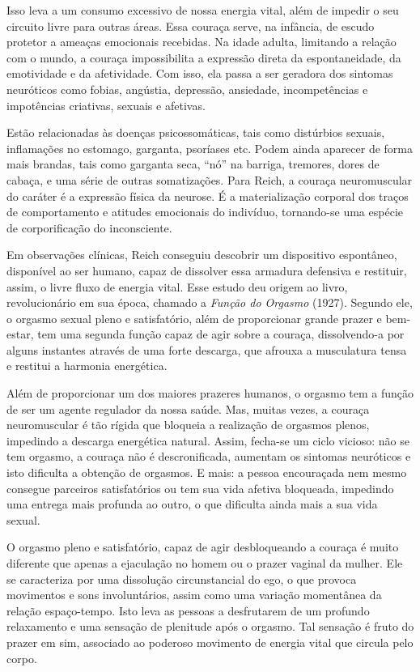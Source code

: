 Isso leva a um consumo excessivo de nossa energia vital, além de impedir
o seu circuito livre para outras áreas. Essa couraça serve, na infância,
de escudo protetor a ameaças emocionais recebidas. Na idade adulta,
limitando a relação com o mundo, a couraça impossibilita a expressão
direta da espontaneidade, da emotividade e da afetividade. Com isso, ela
passa a ser geradora dos sintomas neuróticos como fobias, angústia,
depressão, ansiedade, incompetências e impotências criativas, sexuais e
afetivas.

Estão relacionadas às doenças psicossomáticas, tais como distúrbios
sexuais, inflamações no estomago, garganta, psoríases etc. Podem ainda
aparecer de forma mais brandas, tais como garganta seca, ``nó'' na
barriga, tremores, dores de cabaça, e uma série de outras somatizações.
Para Reich, a couraça neuromuscular do caráter é a expressão física da
neurose. É a materialização corporal dos traços de comportamento e
atitudes emocionais do indivíduo, tornando-se uma espécie de
corporificação do inconsciente.

Em observações clínicas, Reich conseguiu descobrir um dispositivo
espontâneo, disponível ao ser humano, capaz de dissolver essa armadura
defensiva e restituir, assim, o livre fluxo de energia vital. Esse
estudo deu origem ao livro, revolucionário em sua época, chamado a
\emph{Função do Orgasmo} (1927). Segundo ele, o orgasmo sexual pleno e
satisfatório, além de proporcionar grande prazer e bem-estar, tem uma
segunda função capaz de agir sobre a couraça, dissolvendo-a por alguns
instantes através de uma forte descarga, que afrouxa a musculatura tensa
e restitui a harmonia energética.

Além de proporcionar um dos maiores prazeres humanos, o orgasmo tem a
função de ser um agente regulador da nossa saúde. Mas, muitas vezes, a
couraça neuromuscular é tão rígida que bloqueia a realização de orgasmos
plenos, impedindo a descarga energética natural. Assim, fecha-se um
ciclo vicioso: não se tem orgasmo, a couraça não é descronificada,
aumentam os sintomas neuróticos e isto dificulta a obtenção de orgasmos.
E mais: a pessoa encouraçada nem mesmo consegue parceiros satisfatórios
ou tem sua vida afetiva bloqueada, impedindo uma entrega mais profunda
ao outro, o que dificulta ainda mais a sua vida sexual.

O orgasmo pleno e satisfatório, capaz de agir desbloqueando a couraça é
muito diferente que apenas a ejaculação no homem ou o prazer vaginal da
mulher. Ele se caracteriza por uma dissolução circunstancial do ego, o
que provoca movimentos e sons involuntários, assim como uma variação
momentânea da relação espaço-tempo. Isto leva as pessoas a desfrutarem
de um profundo relaxamento e uma sensação de plenitude após o orgasmo.
Tal sensação é fruto do prazer em sim, associado ao poderoso movimento
de energia vital que circula pelo corpo.

